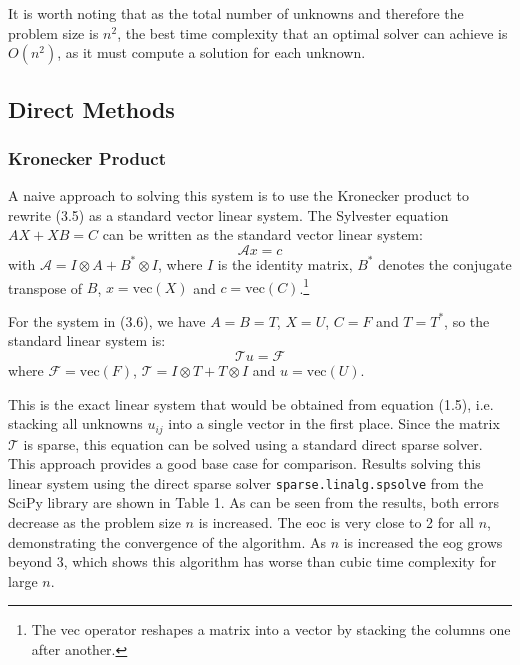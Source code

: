 \documentclass{article}
\numberwithin{equation}{section}
\begin{document}
It is worth noting that as the total number of unknowns and therefore the problem size is $n^2$, the best time complexity that an optimal solver can achieve is $O(n^2)$, as it must compute a solution for each unknown. 

\subsection{Direct Methods}

\subsubsection{Kronecker Product}
A naive approach to solving this system is to use the Kronecker product to rewrite (3.5) as a standard vector linear system. The Sylvester equation $AX + XB = C$ can be written as the standard vector linear system:
\begin{equation}
\mathcal{A}x = c
\end{equation}
with $\mathcal{A} = I \otimes A + B^* \otimes I$, where $I$ is the identity matrix, $B^*$ denotes the conjugate transpose of $B$, $x = \text{vec}(X)$ and $c = \text{vec}(C)$.\footnote{The vec operator reshapes a matrix into a vector by stacking the columns one after another.}

For the system in (3.6), we have $A=B=T$, $X=U$, $C=F$ and $T=T^*$, so the standard linear system is:
\begin{equation}
\mathcal{T}u = \mathcal{F}
\end{equation}
where $\mathcal{F} = \text{vec}(F)$, $\mathcal{T} = I \otimes T + T \otimes I$ and $u = \text{vec}(U)$. 

This is the exact linear system that would be obtained from equation (1.5), i.e. stacking all unknowns $u_{ij}$ into a single vector in the first place. Since the matrix $\mathcal{T}$ is sparse, this equation can be solved using a standard direct sparse solver. This approach provides a good base case for comparison. Results solving this linear system using the direct sparse solver \texttt{sparse.linalg.spsolve} from the SciPy library are shown in Table 1. As can be seen from the results, both errors decrease as the problem size $n$ is increased. The eoc is very close to 2 for all $n$, demonstrating the convergence of the algorithm. As $n$ is increased the eog grows beyond $3$, which shows this algorithm has worse than cubic time complexity for large $n$. 
\end{document}
